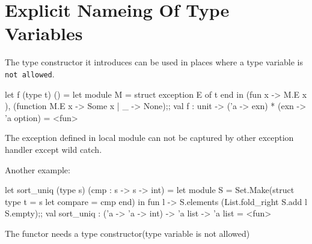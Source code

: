 \section{Explicit Nameing Of Type Variables}
\label{sec:expl-name-type}

The type constructor it introduces can be used in places where a type
variable is \verb|not allowed|.

\begin{ocamlcode}
let f (type t) () = 
    let module M = struct exception E of t end in
    (fun x -> M.E x ), (function M.E x -> Some x | _ -> None);;
val f : unit -> ('a -> exn) * (exn -> 'a option) = <fun>  
\end{ocamlcode}

The exception defined in local module can not be captured by other
exception handler except wild catch.

Another example:
\begin{ocamlcode}
let sort_uniq (type s) (cmp : s -> s -> int) = 
    let module S = Set.Make(struct type t = s let compare = cmp end) in 
    fun l -> S.elements (List.fold_right S.add l S.empty);;
val sort_uniq : ('a -> 'a -> int) -> 'a list -> 'a list = <fun>  
\end{ocamlcode}
The functor needs a type constructor(type variable is not allowed)
